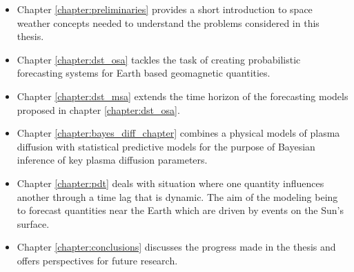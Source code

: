 \begin{itemize}
    \item Chapter \ref{chapter:preliminaries} provides a short introduction to space weather concepts needed to 
    understand the problems considered in this thesis.
    \item Chapter \ref{chapter:dst_osa} tackles the task of creating probabilistic forecasting systems for Earth 
    based geomagnetic quantities.
    \item Chapter \ref{chapter:dst_msa} extends the time horizon of the forecasting models proposed in chapter 
    \ref{chapter:dst_osa}.
    \item Chapter \ref{chapter:bayes_diff_chapter} combines a physical models of plasma diffusion with 
    statistical predictive models for the purpose of Bayesian inference of key plasma diffusion parameters.
    \item Chapter \ref{chapter:pdt} deals with situation where one quantity influences another through a 
    time lag that is dynamic. The aim of the modeling being to forecast quantities near the Earth which 
    are driven by events on the Sun's surface. 
    \item Chapter \ref{chapter:conclusions} discusses the progress made in the thesis and offers perspectives 
    for future research.
\end{itemize}

\clearpage
%
%
